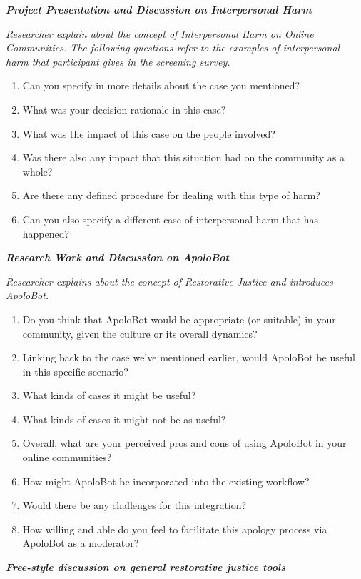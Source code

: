 \textit{\textbf{Project Presentation and Discussion on Interpersonal Harm}}

\textit{Researcher explain about the concept of Interpersonal Harm on Online Communities.
The following questions refer to the examples of interpersonal harm that participant gives in the screening survey.}
\begin{enumerate}
    \item Can you specify in more details about the case you mentioned?
    \item What was your decision rationale in this case?
    \item What was the impact of this case on the people involved?
    \item Was there also any impact that this situation had on the community as a whole?
    \item Are there any defined procedure for dealing with this type of harm?
    \item Can you also specify a different case of interpersonal harm that has happened?
\end{enumerate}

\textit{\textbf{Research Work and Discussion on ApoloBot}}

\textit{Researcher explains about the concept of Restorative Justice and introduces ApoloBot.}

\begin{enumerate}
\item Do you think that ApoloBot would be appropriate (or suitable) in your community, given the culture or its overall dynamics?
\item Linking back to the case we’ve mentioned earlier, would ApoloBot be useful in this specific scenario?
\item What kinds of cases it might be useful?
\item What kinds of cases it might not be as useful?
\item Overall, what are your perceived pros and cons of using ApoloBot in your online communities?
\item How might ApoloBot be incorporated into the existing workflow?
\item Would there be any challenges for this integration?
\item How willing and able do you feel to facilitate this apology process via ApoloBot as a moderator?
\end{enumerate}

\textbf{\textit{Free-style discussion on general restorative justice tools}}

